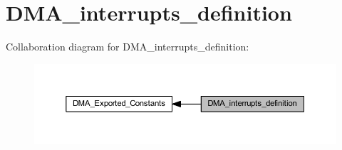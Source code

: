 \hypertarget{group___d_m_a__interrupts__definition}{}\section{D\+M\+A\+\_\+interrupts\+\_\+definition}
\label{group___d_m_a__interrupts__definition}
Collaboration diagram for D\+M\+A\+\_\+interrupts\+\_\+definition\+:
\nopagebreak
\begin{figure}[H]
\begin{center}
\leavevmode
\includegraphics[width=350pt]{group___d_m_a__interrupts__definition}
\end{center}
\end{figure}
